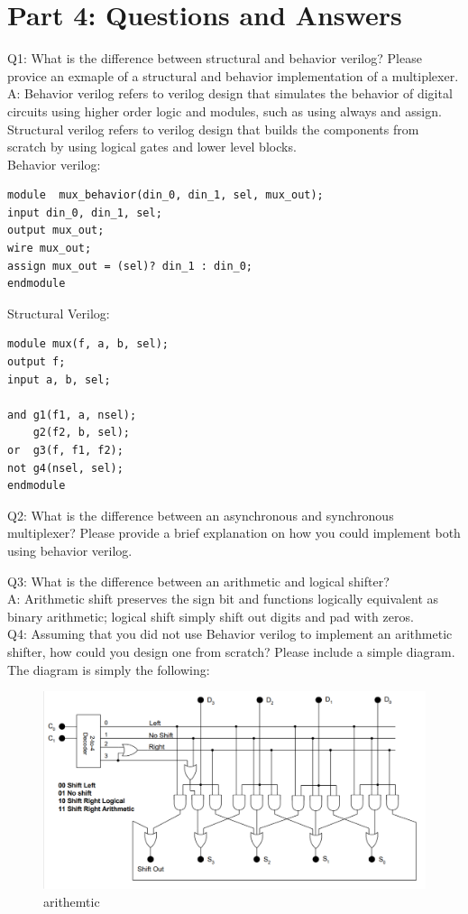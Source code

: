 \documentclass{article}
\begin{document}
\section{Part 4: Questions and Answers}
Q1: What is the difference between structural and behavior verilog? Please provice an exmaple of a structural and behavior implementation of a multiplexer. \\
A: Behavior verilog refers to verilog design that simulates the behavior of digital circuits using higher order logic and modules, such as using always and assign. Structural verilog refers to verilog design that builds the components from scratch by using logical gates and lower level blocks.  \\
Behavior verilog: 
\begin{verbatim}
module  mux_behavior(din_0, din_1, sel, mux_out); 
input din_0, din_1, sel;
output mux_out;
wire mux_out;
assign mux_out = (sel)? din_1 : din_0;
endmodule
\end{verbatim}
Structural Verilog:
\begin{verbatim}
module mux(f, a, b, sel);
output f;
input a, b, sel;

and g1(f1, a, nsel);
	g2(f2, b, sel); 
or  g3(f, f1, f2);
not g4(nsel, sel); 
endmodule 
\end{verbatim}

Q2: What is the difference between an asynchronous and synchronous multiplexer? Please provide a brief explanation on how you could implement both using behavior verilog. \\
\vspace{5mm}

Q3: What is the difference between an arithmetic and logical shifter?\\
A: Arithmetic shift preserves the sign bit and functions logically equivalent as binary arithmetic; logical shift simply shift out digits and pad with zeros.\\

Q4: Assuming that you did not use Behavior verilog to implement an arithmetic shifter, how could you design one from scratch? Please include a simple diagram.\\
The diagram is simply the following: 
\begin{figure}[!htb]
  \centering
  \includegraphics[width=\linewidth]{arithmetic_shift.png}
  \caption{arithemtic}
  \label{fig:arithemtic shift}
\end{figure}
\end{document}
